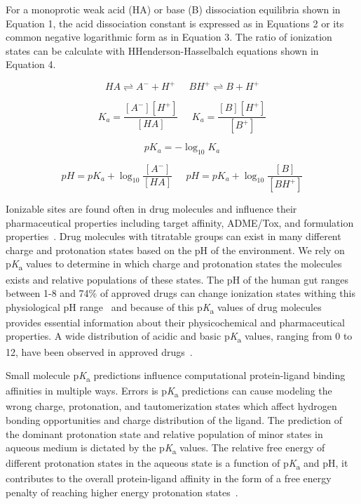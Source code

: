 \documentclass[9pt,lineno,final]{elife}
\newcommand{\pKa}{p\textit{K}\textsubscript{a}}
\begin{document}
For a monoprotic weak acid (HA) or base (B) dissociation equilibria shown in Equation 1, the acid dissociation constant is expressed as in Equations 2 or its common negative logarithmic form as in Equation 3. 
The ratio of ionization states can be calculate with HHenderson-Hasselbalch equations shown in Equation 4. 

\begin{equation}
HA \rightleftharpoons A^- + H^+ \;\;\;\;\; BH^+ \rightleftharpoons B + H^+
\end{equation}

\begin{equation}
K_a = \frac{[A^-][H^+]}{[HA]}\;\;\;\;\;K_a = \frac{[B][H^+]}{[B^+]} 
\end{equation}


\begin{equation}
pK_a = -\log_{10}{K_a}
\end{equation}


\begin{equation}
pH = pK_a + \log_{10}{\frac{[A^-]}{[HA]}}\;\;\;\;\;pH = pK_a + \log_{10}{\frac{[B]}{[BH^+]}}
\end{equation}


Ionizable sites are found often in drug molecules and influence their pharmaceutical properties including target affinity, ADME/Tox, and formulation properties~\citep{Manallack:2013:ChemSocRev}. 
Drug molecules with titratable groups can exist in many different charge and protonation states based on the pH of the environment. 
We rely on \pKa{} values to determine in which charge and protonation states the molecules exists and relative populations of these states. 
The pH of the human gut ranges between 1-8 and 74\% of approved drugs can change ionization states withing this physiological pH range~\citep{Manallack:2013:ChemMedChema} and because of this \pKa{} values of drug molecules provides essential information about their physicochemical and pharmaceutical properties. 
A wide distribution of acidic and basic \pKa{} values, ranging from 0 to 12, have been observed in approved drugs~\citep{Manallack:2013:ChemMedChema, Manallack:2013:ChemSocRev}.

Small molecule \pKa{} predictions influence computational protein-ligand binding affinities in multiple ways. 
Errors is \pKa{} predictions can cause modeling the wrong charge, protonation, and tautomerization states which affect hydrogen bonding opportunities and charge distribution of the ligand.
The prediction of the dominant protonation state and relative population of minor states in aqueous medium is dictated by the \pKa{} values. 
The relative free energy of different protonation states in the aqueous state is a function of \pKa{} and pH, it contributes to the overall protein-ligand affinity in the form of a free energy penalty of reaching higher energy protonation states~\citep{deOliveira:2019:J.Chem.TheoryComput.}.
\end{document}
